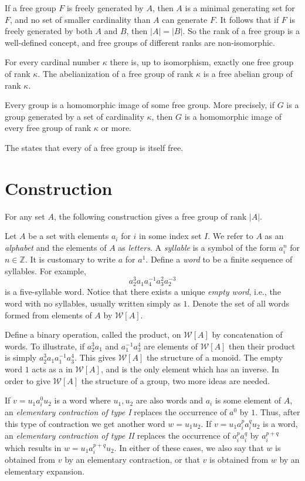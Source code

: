\documentclass[12pt]{article}
\def\WA{\mathcal{W}[A]}
\begin{document}
If a free group $F$ is freely generated by $A$, then $A$ is a minimal generating set for $F$, and no set of smaller cardinality than $A$ can generate $F$.
It follows that if $F$ is freely generated by both $A$ and $B$, then $|A|=|B|$. So the rank of a free group is a well-defined concept, and free groups of different ranks are non-isomorphic.

For every cardinal number $\kappa$ there is, up to isomorphism, exactly one free group of rank $\kappa$.
The abelianization of a free group of rank $\kappa$ is a free abelian group of rank $\kappa$.

Every group is a homomorphic image of some free group.
More precisely, if $G$ is a group generated by a set of cardinality $\kappa$, then $G$ is a homomorphic image of every free group of rank $\kappa$ or more.

The  states that every  of a free group is itself free.

\section*{Construction}

For any set $A$, the following construction gives a free group of rank $|A|$.

Let $A$ be a set with elements $a_{i}$ for $i$ in some index set $I$. 
We refer to $A$ as an \emph{alphabet} and the elements of $A$ as \emph{letters}.
A \emph{syllable} is a symbol of the form $a_{i}^n$ for $n \in \mathbb{Z}$.
It is customary to write $a$ for $a^1$. Define a \emph{word} to be a finite sequence of syllables. For example, 
$$ a_2^3a_1a_4^{-1}a_3^2a_2^{-3}$$
is a five-syllable word. Notice that there exists a unique \emph{empty word}, i.e., the word with no syllables, usually written simply as $1$. 
Denote the set of all words formed from elements of $A$ by $\WA$. 

Define a binary operation, called the product, on $\WA$ by concatenation of words. To illustrate, if $a_2^{3}a_1$ and $a_1^{-1}a_3^{4}$ are elements of $\WA$ then their product is simply $a_2^{3}a_1a_1^{-1}a_3^{4}$. 
This gives $\WA$ the structure of a monoid. 
The empty word $1$ acts as a  in $\WA$, and is the only element which has an inverse. In order to give $\WA$ the structure of a group, two more ideas are needed.

If $v=u_1a_i^0u_2$ is a word where $u_1,u_2$ are also words and $a_i$ is some element of $A$, an \emph{elementary contraction of type I} replaces the occurrence of $a^0$ by $1$. Thus, after this type of contraction we get another word $w=u_1u_2$. If $v=u_1a_i^pa_i^qu_2$ is a word, an \emph{elementary contraction of type II} replaces the occurrence of $a_i^pa_i^q$ by $a_i^{p+q}$ which results in $w=u_1a_i^{p+q}u_2$. In either of these cases, we also say that $w$ is obtained from $v$ by an elementary contraction, or that $v$ is obtained from $w$ by an elementary expansion.
\end{document}
